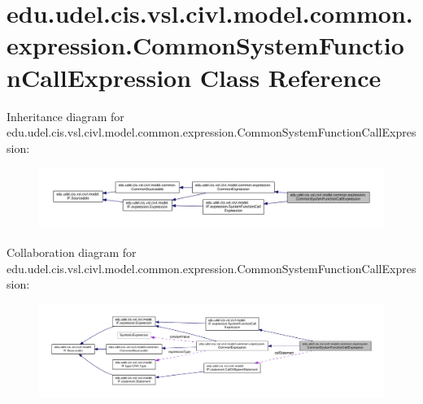 \hypertarget{classedu_1_1udel_1_1cis_1_1vsl_1_1civl_1_1model_1_1common_1_1expression_1_1CommonSystemFunctionCallExpression}{}\section{edu.\+udel.\+cis.\+vsl.\+civl.\+model.\+common.\+expression.\+Common\+System\+Function\+Call\+Expression Class Reference}
\label{classedu_1_1udel_1_1cis_1_1vsl_1_1civl_1_1model_1_1common_1_1expression_1_1CommonSystemFunctionCallExpression}


Inheritance diagram for edu.\+udel.\+cis.\+vsl.\+civl.\+model.\+common.\+expression.\+Common\+System\+Function\+Call\+Expression\+:
\nopagebreak
\begin{figure}[H]
\begin{center}
\leavevmode
\includegraphics[width=350pt]{classedu_1_1udel_1_1cis_1_1vsl_1_1civl_1_1model_1_1common_1_1expression_1_1CommonSystemFunctionCallExpression__inherit__graph}
\end{center}
\end{figure}


Collaboration diagram for edu.\+udel.\+cis.\+vsl.\+civl.\+model.\+common.\+expression.\+Common\+System\+Function\+Call\+Expression\+:
\nopagebreak
\begin{figure}[H]
\begin{center}
\leavevmode
\includegraphics[width=350pt]{classedu_1_1udel_1_1cis_1_1vsl_1_1civl_1_1model_1_1common_1_1expression_1_1CommonSystemFunctionCallExpression__coll__graph}
\end{center}
\end{figure}
